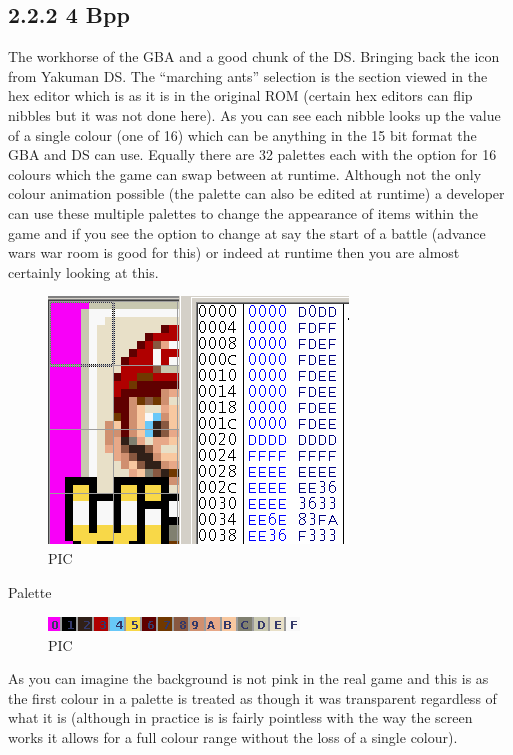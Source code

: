 \documentclass[
]{book}
\begin{document}
\hypertarget{bpp-1}{%
\subsection{2.2.2 4 Bpp}\label{bpp-1}}

The workhorse of the GBA and a good chunk of the DS. Bringing back the icon from Yakuman DS. The ``marching ants'' selection is the section viewed in the hex editor which is as it is in the original ROM (certain hex editors can flip nibbles but it was not done here). As you can see each nibble looks up the value of a single colour (one of 16) which can be anything in the 15 bit format the GBA and DS can use. Equally there are 32 palettes each with the option for 16 colours which the game can swap between at runtime. Although not the only colour animation possible (the palette can also be edited at runtime) a developer can use these multiple palettes to change the appearance of items within the game and if you see the option to change at say the start of a battle (advance wars war room is good for this) or indeed at runtime then you are almost certainly looking at this.

\begin{figure}
\centering
\includegraphics{images/0_home_fast6191_romhackingguide_unrenamed_files_and_original_borders_romhackingendiandemo.png}
\caption{PIC}
\end{figure}

Palette

\begin{figure}
\centering
\includegraphics{images/21_home_fast6191_romhackingguide_unrenamed_file___inal_borders_romhackingguide4bpppalettedemo.png}
\caption{PIC}
\end{figure}

As you can imagine the background is not pink in the real game and this is as the first colour in a palette is treated as though it was transparent regardless of what it is (although in practice is is fairly pointless with the way the screen works it allows for a full colour range without the loss of a single colour).
\end{document}

